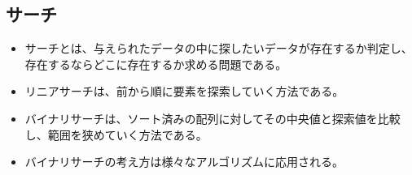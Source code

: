 \begin{shadebox}
\subsection*{サーチ}
\begin{itemize}
\item サーチとは、与えられたデータの中に探したいデータが存在するか判定し、存在するならどこに存在するか求める問題である。
\item リニアサーチは、前から順に要素を探索していく方法である。
\item バイナリサーチは、ソート済みの配列に対してその中央値と探索値を比較し、範囲を狭めていく方法である。
\item バイナリサーチの考え方は様々なアルゴリズムに応用される。
\end{itemize}
\end{shadebox}
